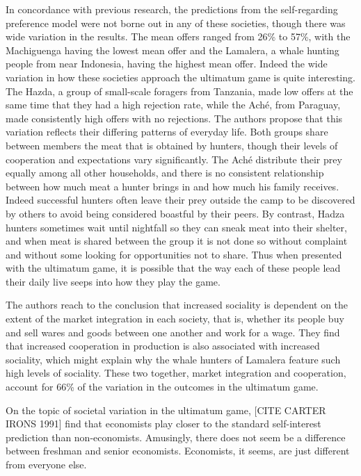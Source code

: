 \message{ !name(tese.tex)}\documentclass{article}
\begin{document}
In concordance with previous research, the predictions from the self-regarding preference model were not borne out in any of these societies, though there was wide variation in the results. The mean offers ranged from 26\% to 57\%, with the Machiguenga having the lowest mean offer and the Lamalera, a whale hunting people from near Indonesia, having the highest mean offer. Indeed the wide variation in how these societies approach the ultimatum game is quite interesting. The Hazda, a group of small-scale foragers from Tanzania, made low offers at the same time that they had a high rejection rate, while the Aché, from Paraguay, made consistently high offers with no rejections. The authors propose that this variation reflects their differing patterns of everyday life. Both groups share between members the meat that is obtained by hunters, though their levels of cooperation and expectations vary significantly. The Aché distribute their prey equally among all other households, and there is no consistent relationship between how much meat a hunter brings in and how much his family receives. Indeed successful hunters often leave their prey outside the camp to be discovered by others to avoid being considered boastful by their peers. By contrast, Hadza hunters sometimes wait until nightfall so they can sneak meat into their shelter, and when meat is shared between the group it is not done so without complaint and without some looking for opportunities not to share. Thus when presented with the ultimatum game, it is possible that the way each of these people lead their daily live seeps into how they play the game. 

The authors reach to the conclusion that increased sociality is dependent on the extent of the market integration in each society, that is, whether its people buy and sell wares and goods between one another and work for a wage. They find that increased cooperation in production is also associated with increased sociality, which might explain why the whale hunters of Lamalera feature such high levels of sociality. These two together, market integration and cooperation, account for 66\% of the variation in the outcomes in the ultimatum game. 

On the topic of societal variation in the ultimatum game, [CITE CARTER IRONS 1991] find that economists play closer to the standard self-interest prediction than non-economists. Amusingly, there does not seem be a difference between freshman and senior economists. Economists, it seems, are just different from everyone else. 
\end{document}
